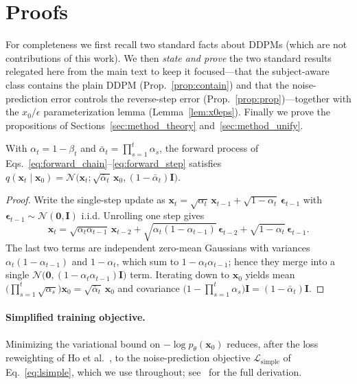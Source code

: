 \appendix

\section{Proofs}
\label{app:proofs}

For completeness we first recall two standard facts about DDPMs (which are not
contributions of this work). We then \emph{state and prove} the two standard
results relegated here from the main text to keep it focused---that the
subject-aware class contains the plain DDPM (Prop.~\ref{prop:contain}) and that
the noise-prediction error controls the reverse-step error
(Prop.~\ref{prop:prop})---together with the $x_0/\epsilon$ parameterization lemma
(Lemma~\ref{lem:x0eps}). Finally we prove the propositions of
Sections~\ref{sec:method_theory} and~\ref{sec:method_unify}.

\begin{lemma}
\label{lem:marginal}
With $\alpha_t=1-\beta_t$ and $\bar{\alpha}_t=\prod_{s=1}^{t}\alpha_s$, the forward
process of Eqs.~\eqref{eq:forward_chain}--\eqref{eq:forward_step} satisfies
$q(\mathbf{x}_t\mid\mathbf{x}_0)=\mathcal{N}\!\big(\mathbf{x}_t;\sqrt{\bar{\alpha}_t}\,\mathbf{x}_0,(1-\bar{\alpha}_t)\mathbf{I}\big)$.
\end{lemma}

\begin{proof}
Write the single-step update as
$\mathbf{x}_t=\sqrt{\alpha_t}\,\mathbf{x}_{t-1}+\sqrt{1-\alpha_t}\,\boldsymbol{\epsilon}_{t-1}$
with $\boldsymbol{\epsilon}_{t-1}\sim\mathcal{N}(\mathbf{0},\mathbf{I})$ i.i.d.
Unrolling one step gives
\[
\mathbf{x}_t=\sqrt{\alpha_t\alpha_{t-1}}\,\mathbf{x}_{t-2}
+\sqrt{\alpha_t(1-\alpha_{t-1})}\,\boldsymbol{\epsilon}_{t-2}
+\sqrt{1-\alpha_t}\,\boldsymbol{\epsilon}_{t-1}.
\]
The last two terms are independent zero-mean Gaussians with variances
$\alpha_t(1-\alpha_{t-1})$ and $1-\alpha_t$, which sum to
$1-\alpha_t\alpha_{t-1}$; hence they merge into a single
$\mathcal{N}\!\big(\mathbf{0},(1-\alpha_t\alpha_{t-1})\mathbf{I}\big)$ term.
Iterating down to $\mathbf{x}_0$ yields mean
$\big(\prod_{s=1}^{t}\sqrt{\alpha_s}\big)\mathbf{x}_0=\sqrt{\bar{\alpha}_t}\,\mathbf{x}_0$
and covariance $\big(1-\prod_{s=1}^{t}\alpha_s\big)\mathbf{I}=(1-\bar{\alpha}_t)\mathbf{I}$.
\end{proof}

\paragraph{Simplified training objective.}
Minimizing the variational bound on $-\log p_\theta(\mathbf{x}_0)$ reduces, after
the loss reweighting of Ho et al.~\cite{ho2020ddpm}, to the noise-prediction
objective $\mathcal{L}_{\text{simple}}$ of Eq.~\eqref{eq:lsimple}, which we use
throughout; see~\cite{ho2020ddpm} for the full derivation.

